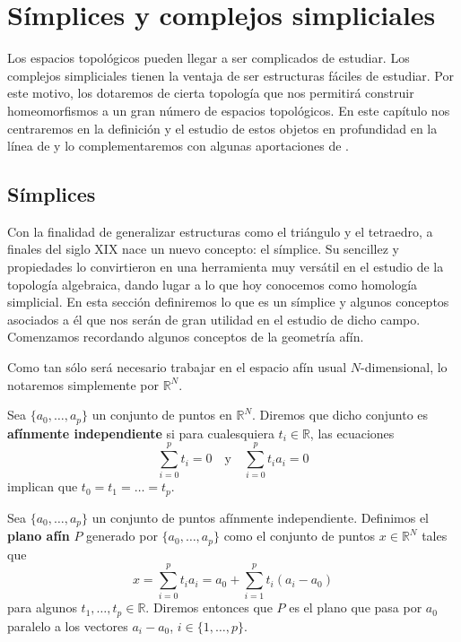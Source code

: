 
\chapter{Símplices y complejos simpliciales}
\label{chapter:complex}

Los espacios topológicos pueden llegar a ser complicados de estudiar. Los
complejos simpliciales tienen la ventaja de ser estructuras fáciles de estudiar.
Por este motivo, los dotaremos de cierta topología que nos permitirá construir
homeomorfismos a un gran número de espacios topológicos. En este capítulo nos centraremos
en la definición y el estudio de estos objetos en profundidad en la línea de \cite{munkres2018elements}
y lo complementaremos con algunas aportaciones de \cite{lee2010introduction}.

\section{Símplices}
Con la finalidad de generalizar estructuras como el triángulo y el tetraedro, a
finales del siglo XIX nace un nuevo concepto: el símplice. Su sencillez y
propiedades lo convirtieron en una herramienta muy versátil en el estudio de la
topología algebraica, dando lugar a lo que hoy conocemos como homología simplicial.
En esta sección definiremos lo que es un símplice y algunos conceptos asociados
a él que nos serán de gran utilidad en el estudio de dicho campo. Comenzamos recordando
algunos conceptos de la geometría afín.

Como tan sólo será necesario trabajar en el espacio afín usual $N$-dimensional,
lo notaremos simplemente por $\mathbb{R}^{N}$.

\begin{definicion}
	Sea $\{a_{0}, \ldots, a_{p}\}$ un conjunto de puntos en $\mathbb{R}^{N}$.
	Diremos que dicho conjunto es \textbf{afínmente independiente} si para cualesquiera
	$t_{i}\in \mathbb{R}$, las ecuaciones
	\[
	\sum_{i=0}^{p}t_{i}=0 \quad \text{y}\quad \sum_{i=0}^{p}t_{i}a_{i}=0
	\]
	implican que $t_{0}= t_{1}= \ldots = t_{p}$.
\end{definicion}

\begin{definicion}
	Sea $\{a_{0}, \ldots, a_{p}\}$ un conjunto de puntos afínmente independiente.
	Definimos el \textbf{plano afín} $P$ generado por $\{a_{0}, \ldots, a_{p}\}$ como
	el conjunto de puntos $x \in \mathbb{R}^{N}$ tales que
	\[
	x = \sum_{i=0}^{p}t_{i}a_{i}= a_{0}+ \sum_{i=1}^{p}t_{i}(a_{i}- a_{0})
	\]
	para algunos $t_{1}, \ldots, t_{p}\in \mathbb{R}$. Diremos entonces que $P$ es
	el plano que pasa por $a_{0}$ paralelo a los vectores $a_{i}- a_{0}$, $i \in \{
	1, \ldots, p\}$.
\end{definicion}

